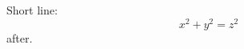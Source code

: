 \documentclass[10pt,fleqn,leqno]{article}
\begin{document}
Short line:
\begin{equation} x^2 + y^2 = z^2 \end{equation}
after.
\end{document}
